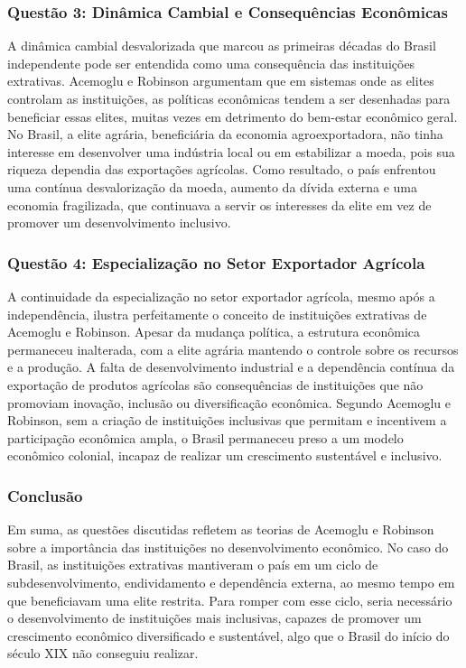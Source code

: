 \documentclass[a4paper,12pt]{article}[abntex2]
\begin{document}
\subsubsection{\textbf{Questão 3: Dinâmica Cambial e Consequências Econômicas}}

A dinâmica cambial desvalorizada que marcou as primeiras décadas do Brasil independente pode ser entendida como uma consequência das instituições extrativas. Acemoglu e Robinson argumentam que em sistemas onde as elites controlam as instituições, as políticas econômicas tendem a ser desenhadas para beneficiar essas elites, muitas vezes em detrimento do bem-estar econômico geral. No Brasil, a elite agrária, beneficiária da economia agroexportadora, não tinha interesse em desenvolver uma indústria local ou em estabilizar a moeda, pois sua riqueza dependia das exportações agrícolas. Como resultado, o país enfrentou uma contínua desvalorização da moeda, aumento da dívida externa e uma economia fragilizada, que continuava a servir os interesses da elite em vez de promover um desenvolvimento inclusivo.

\subsubsection{\textbf{Questão 4: Especialização no Setor Exportador Agrícola}}

A continuidade da especialização no setor exportador agrícola, mesmo após a independência, ilustra perfeitamente o conceito de instituições extrativas de Acemoglu e Robinson. Apesar da mudança política, a estrutura econômica permaneceu inalterada, com a elite agrária mantendo o controle sobre os recursos e a produção. A falta de desenvolvimento industrial e a dependência contínua da exportação de produtos agrícolas são consequências de instituições que não promoviam inovação, inclusão ou diversificação econômica. Segundo Acemoglu e Robinson, sem a criação de instituições inclusivas que permitam e incentivem a participação econômica ampla, o Brasil permaneceu preso a um modelo econômico colonial, incapaz de realizar um crescimento sustentável e inclusivo.

\subsubsection{\textbf{Conclusão}}

Em suma, as questões discutidas refletem as teorias de Acemoglu e Robinson sobre a importância das instituições no desenvolvimento econômico. No caso do Brasil, as instituições extrativas mantiveram o país em um ciclo de subdesenvolvimento, endividamento e dependência externa, ao mesmo tempo em que beneficiavam uma elite restrita. Para romper com esse ciclo, seria necessário o desenvolvimento de instituições mais inclusivas, capazes de promover um crescimento econômico diversificado e sustentável, algo que o Brasil do início do século XIX não conseguiu realizar.
\end{document}
